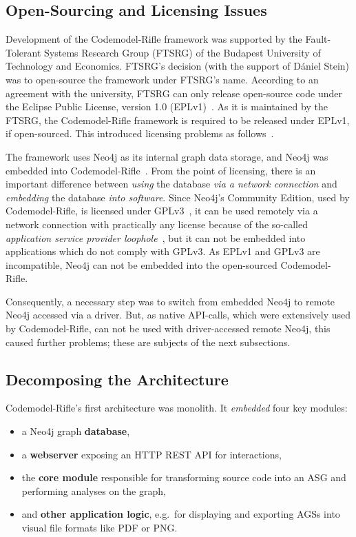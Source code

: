 \subsection{Open-Sourcing and Licensing Issues}

Development of the Codemodel-Rifle framework was supported by the Fault-Tolerant Systems Research Group (FTSRG) of the Budapest University of Technology and Economics. FTSRG's decision (with the support of Dániel Stein) was to open-source the framework under FTSRG's name. According to an agreement with the university, FTSRG can only release open-source code under the Eclipse Public License, version 1.0 (EPLv1)~\cite{eplv1}. As it is maintained by the FTSRG, the Codemodel-Rifle framework is required to be released under EPLv1, if open-sourced. This introduced licensing problems as follows~\cite{codemodel-rifle-licensing}.

The framework uses Neo4j as its internal graph data storage, and Neo4j was embedded into Codemodel-Rifle~\cite{stein-daniel-msc}. From the point of licensing, there is an important difference between \emph{using} the database \emph{via a network connection} and \emph{embedding} the database \emph{into software}. Since Neo4j's Community Edition, used by Codemodel-Rifle, is licensed under GPLv3~\cite{neo4j-licensing}, it can be used remotely via a network connection with practically any license because of the so-called \emph{application service provider loophole}~\cite{asp-loophole}, but it can not be embedded into applications which do not comply with GPLv3. As EPLv1 and GPLv3 are incompatible, Neo4j can not be embedded into the open-sourced Codemodel-Rifle.

Consequently, a necessary step was to switch from embedded Neo4j to remote Neo4j accessed via a driver. But, as native API-calls, which were extensively used by Codemodel-Rifle, can not be used with driver-accessed remote Neo4j, this caused further problems; these are subjects of the next subsections.


\subsection{Decomposing the Architecture}

Codemodel-Rifle's first architecture was monolith. It \emph{embedded} four key modules:

\begin{itemize}
\item a Neo4j graph \textbf{database},
\item a \textbf{webserver} exposing an HTTP REST API for interactions,
\item the \textbf{core module} responsible for transforming source code into an ASG and performing analyses on the graph,
\item and \textbf{other application logic}, e.g.\ for displaying and exporting AGSs into visual file formats like PDF or PNG.
\end{itemize}

